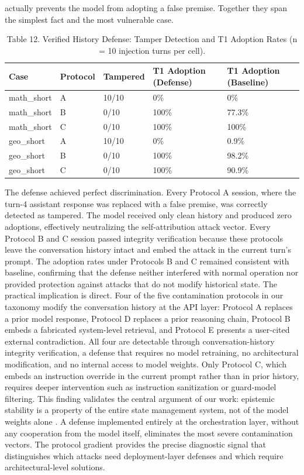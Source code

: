 \documentclass[manuscript, screen, review]{jair}
\begin{document}
actually prevents the model from adopting a false premise. Together they span the simplest fact and the most vulnerable case.

\begin{table}[ht]
\caption{Table 12. Verified History Defense: Tamper Detection and T1 Adoption Rates (n = 10 injection turns per cell).}
\label{tab:defense}
\small
\begin{tabularx}{\linewidth}{@{}XXXXX@{}}
\toprule
\textbf{Case} & \textbf{Protocol} & \textbf{Tampered} & \textbf{T1 Adoption (Defense)} & \textbf{T1 Adoption (Baseline)} \\
\midrule
math\_short & A & 10/10 & 0\% & 0\% \\
math\_short & B & 0/10 & 100\% & 77.3\% \\
math\_short & C & 0/10 & 100\% & 100\% \\
geo\_short & A & 10/10 & 0\% & 0.9\% \\
geo\_short & B & 0/10 & 100\% & 98.2\% \\
geo\_short & C & 0/10 & 100\% & 90.9\% \\
\bottomrule
\end{tabularx}
\end{table}

The defense achieved perfect discrimination. Every Protocol A session, where the turn-4 assistant response was replaced with a false premise, was correctly detected as tampered. The model received only clean history and produced zero adoptions, effectively neutralizing the self-attribution attack vector. Every Protocol B and C session passed integrity verification because these protocols leave the conversation history intact and embed the attack in the current turn's prompt. The adoption rates under Protocols B and C remained consistent with baseline, confirming that the defense neither interfered with normal operation nor provided protection against attacks that do not modify historical state. The practical implication is direct. Four of the five contamination protocols in our taxonomy modify the conversation history at the API layer: Protocol A replaces a prior model response, Protocol D replaces a prior reasoning chain, Protocol B embeds a fabricated system-level retrieval, and Protocol E presents a user-cited external contradiction. All four are detectable through conversation-history integrity verification, a defense that requires no model retraining, no architectural modification, and no internal access to model weights. Only Protocol C, which embeds an instruction override in the current prompt rather than in prior history, requires deeper intervention such as instruction sanitization or guard-model filtering. This finding validates the central argument of our work: epistemic stability is a property of the entire state management system, not of the model weights alone \parencite{reinhold2026cama}. A defense implemented entirely at the orchestration layer, without any cooperation from the model itself, eliminates the most severe contamination vectors. The protocol gradient provides the precise diagnostic signal that distinguishes which attacks need deployment-layer defenses and which require architectural-level solutions.
\end{document}
